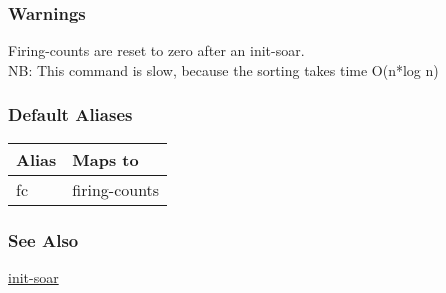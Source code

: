 \subsubsection*{Warnings}
 Firing-counts are reset to zero after an init-soar. \\ 
 NB: This command is slow, because the sorting takes time O(n*log n) 
\subsubsection*{Default Aliases}
\begin{tabular}{|l|l|}
\hline 
 Alias  & Maps to  \\
 \hline 
 fc  & firing-counts  \\
 \hline 
\end{tabular}
\subsubsection*{See Also}
\hyperref[init-soar]{init-soar} 